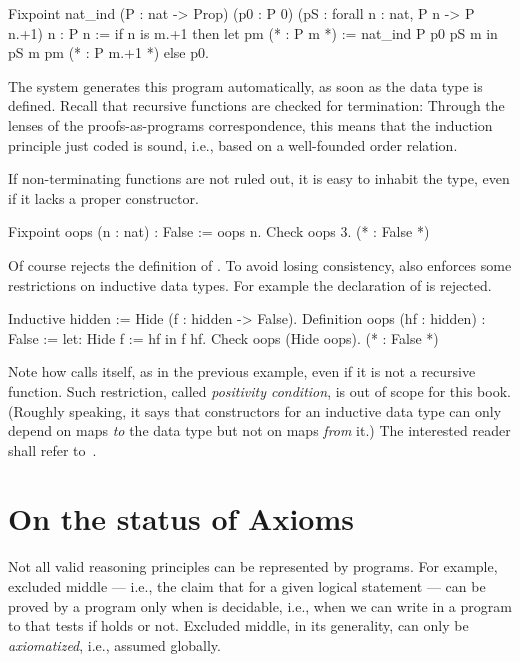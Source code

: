 \begin{coq}{}{}
Fixpoint nat_ind (P : nat -> Prop)
  (p0 : P 0) (pS : forall n : nat, P n -> P n.+1) n : P n :=
  if n is m.+1 then
    let pm (* : P m *) := nat_ind P p0 pS m in
    pS m pm (* : P m.+1 *)
  else p0.
\end{coq}

The \Coq{} system generates this program automatically, as soon as
 the  data type
is defined.  Recall that recursive functions are checked for termination:
Through the lenses of the proofs-as-programs correspondence, this means
that the induction principle just coded is sound, i.e., based on a
well-founded order relation.

If non-terminating functions are not ruled out, it is easy to inhabit
the  type, even if it lacks a proper constructor.

\begin{coq}{}{}
Fixpoint oops (n : nat) : False := oops n.
Check oops 3.  (* : False *)
\end{coq}
Of course \Coq{} rejects the definition of .  To avoid
losing consistency, \Coq{} also enforces some restrictions on
inductive data types.  For example the declaration of 
is rejected.

\begin{coq}{}{}
Inductive hidden := Hide (f : hidden -> False).
Definition oops (hf : hidden) : False := let: Hide f := hf in f hf.
Check oops (Hide oops).  (* : False *)
\end{coq}
Note how  calls itself, as in the previous example,
even if it is not a recursive function.
Such restriction, called
\emph{positivity condition}, is out of scope for this book.
(Roughly speaking, it says that constructors for an inductive data
type can only depend on maps \emph{to} the data type but not on maps
\emph{from} it.)
The interested reader shall refer to~\cite{Coq:manual}.

\section{On the status of Axioms}
\label{sec:EM}

Not all valid reasoning principles can be represented by programs.
For example, excluded middle --- i.e., the claim that
 for a given logical statement  ---
can be proved by a program only when
 is decidable, i.e., when we can write in \Coq{} a program
to  that tests if  holds or not.
Excluded middle, in its generality, can only be \emph{axiomatized},
i.e., assumed globally.

